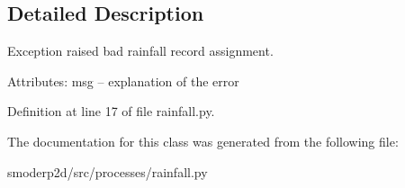 \subsection{Detailed Description}
\begin{DoxyVerb}Exception raised bad rainfall record assignment.

Attributes:
    msg  -- explanation of the error
\end{DoxyVerb}
 

Definition at line 17 of file rainfall.\-py.



The documentation for this class was generated from the following file\-:\begin{DoxyCompactItemize}
\item 
smoderp2d/src/processes/rainfall.\-py\end{DoxyCompactItemize}
